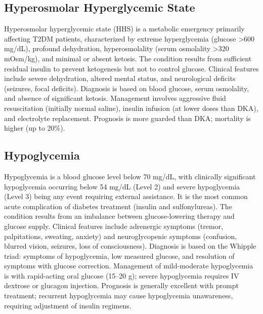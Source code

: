 \subsection{Hyperosmolar Hyperglycemic State}
\label{sec:Hyperosmolar Hyperglycemic State}
Hyperosmolar hyperglycemic state (HHS) is a metabolic emergency primarily affecting T2DM patients, characterized by extreme hyperglycemia (glucose >600 mg/dL), profound dehydration, hyperosmolality (serum osmolality >320 mOsm/kg), and minimal or absent ketosis. The condition results from sufficient residual insulin to prevent ketogenesis but not to control glucose. Clinical features include severe dehydration, altered mental status, and neurological deficits (seizures, focal deficits). Diagnosis is based on blood glucose, serum osmolality, and absence of significant ketosis. Management involves aggressive fluid resuscitation (initially normal saline), insulin infusion (at lower doses than DKA), and electrolyte replacement. Prognosis is more guarded than DKA; mortality is higher (up to 20\%).

\subsection{Hypoglycemia}
\label{sec:Hypoglycemia}
Hypoglycemia is a blood glucose level below 70 mg/dL, with clinically significant hypoglycemia occurring below 54 mg/dL (Level 2) and severe hypoglycemia (Level 3) being any event requiring external assistance. It is the most common acute complication of diabetes treatment (insulin and sulfonylureas). The condition results from an imbalance between glucose-lowering therapy and glucose supply. Clinical features include adrenergic symptoms (tremor, palpitations, sweating, anxiety) and neuroglycopenic symptoms (confusion, blurred vision, seizures, loss of consciousness). Diagnosis is based on the Whipple triad: symptoms of hypoglycemia, low measured glucose, and resolution of symptoms with glucose correction. Management of mild-moderate hypoglycemia is with rapid-acting oral glucose (15--20 g); severe hypoglycemia requires IV dextrose or glucagon injection. Prognosis is generally excellent with prompt treatment; recurrent hypoglycemia may cause hypoglycemia unawareness, requiring adjustment of insulin regimens.

